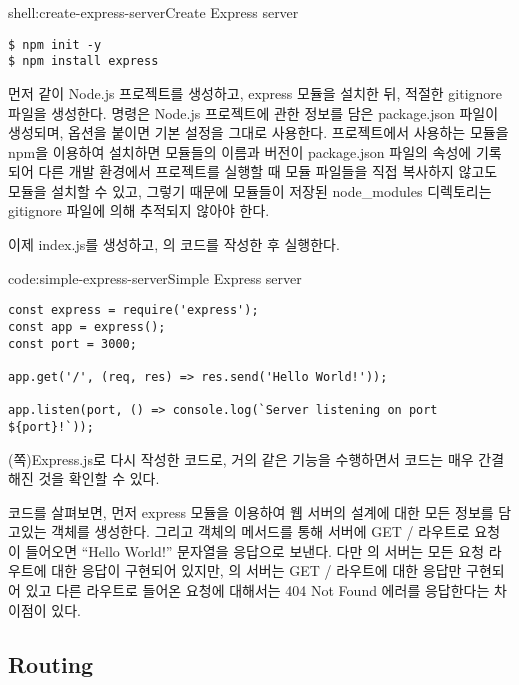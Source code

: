 \begin{shell}{shell:create-express-server}{Create Express server}
\begin{verbatim}
$ npm init -y
$ npm install express
\end{verbatim}
\end{shell}

먼저 \와 같이 Node.js 프로젝트를 생성하고, express 모듈을 설치한 뒤, 적절한 gitignore 파일을 생성한다.  명령은 Node.js 프로젝트에 관한 정보를 담은 package.json 파일이 생성되며,  옵션을 붙이면 기본 설정을 그대로 사용한다. 프로젝트에서 사용하는 모듈을 npm을 이용하여 설치하면 모듈들의 이름과 버전이 package.json 파일의  속성에 기록되어 다른 개발 환경에서 프로젝트를 실행할 때 모듈 파일들을 직접 복사하지 않고도 모듈을 설치할 수 있고, 그렇기 때문에 모듈들이 저장된 node\_modules 디렉토리는 gitignore 파일에 의해 추적되지 않아야 한다.

이제 index.js를 생성하고, 의 코드를 작성한 후 실행한다.

\begin{code}{code:simple-express-server}{Simple Express server}
\begin{verbatim}
const express = require('express');
const app = express();
const port = 3000;

app.get('/', (req, res) => res.send('Hello World!'));

app.listen(port, () => console.log(`Server listening on port ${port}!`));
\end{verbatim}
\end{code}

\는 (\pageref{code:nodejs-simple-web-server}쪽)\를 Express.js로 다시 작성한 코드로, 거의 같은 기능을 수행하면서 코드는 매우 간결해진 것을 확인할 수 있다.

코드를 살펴보면, 먼저 express 모듈을 이용하여 웹 서버의 설계에 대한 모든 정보를 담고있는  객체를 생성한다. 그리고  객체의  메서드를 통해 서버에 GET / 라우트로 요청이 들어오면 ``Hello World!'' 문자열을 응답으로 보낸다. 다만 의 서버는 모든 요청 라우트에 대한 응답이 구현되어 있지만, 의 서버는 GET / 라우트에 대한 응답만 구현되어 있고 다른 라우트로 들어온 요청에 대해서는 404 Not Found 에러를 응답한다는 차이점이 있다.

\subsection*{Routing}


